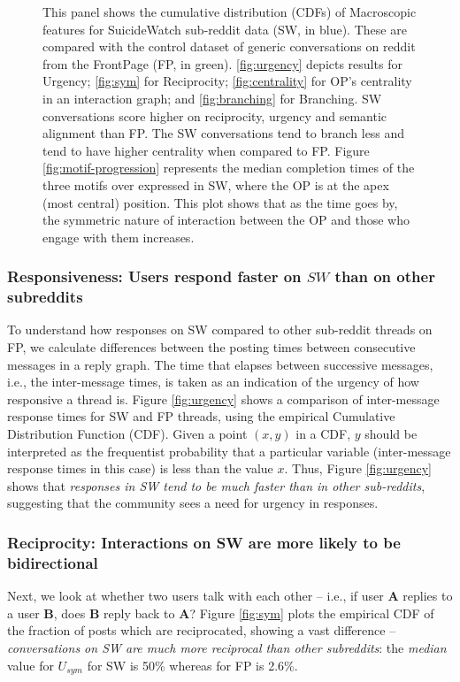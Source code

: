 \begin{figure}[!h]
    
\caption{This panel shows the cumulative distribution  (CDFs) of Macroscopic features for SuicideWatch sub-reddit data (SW, in blue). These are compared with the control dataset of generic conversations on reddit from the FrontPage (FP, in green). \ref{fig:urgency} depicts results for Urgency; \ref{fig:sym} for Reciprocity; \ref{fig:centrality} for OP's  centrality in an interaction graph; 
and \ref{fig:branching} for Branching. SW conversations score higher on reciprocity, urgency and semantic alignment than FP. The SW conversations tend to branch less and tend to have higher centrality when compared to FP. Figure \ref{fig:motif-progression} represents the median completion times of the three motifs over expressed in SW, where the OP is at the apex (most central) position. This plot shows that as the time goes by, the symmetric nature of interaction between the OP and those who engage with them increases.}
\end{figure}

\subsubsection{Responsiveness: Users respond faster on $SW$ than on other subreddits}
To understand how responses on SW compared to other sub-reddit threads on FP, we calculate differences between the posting times between consecutive messages in a reply graph. The time that elapses between successive messages, i.e., the inter-message times, is taken as an indication of the urgency of how responsive a thread is. Figure \ref{fig:urgency} shows a comparison of inter-message response times for SW and FP threads, using the empirical Cumulative Distribution Function (CDF). Given a point $(x,y)$ in a CDF, $y$ should be interpreted as the frequentist probability that a particular variable (inter-message response times in this case) is less than the value $x$. Thus, Figure \ref{fig:urgency} shows that \textit{responses in SW tend to be much faster than in other sub-reddits}, suggesting that the community sees a need for urgency in responses. %



\subsubsection{Reciprocity: Interactions on SW are more likely to be bidirectional}
Next, we look at whether two users talk with each other -- i.e., if user \textbf{A} replies to a user \textbf{B}, does \textbf{B} reply back to \textbf{A}?  Figure \ref{fig:sym} plots the empirical CDF of the fraction of posts which are reciprocated, showing a vast difference -- \textit{conversations on  SW are much more reciprocal than other subreddits}: the \textit{median} value for $U_{sym}$ for SW is 50\% whereas for FP is 2.6\%. 

